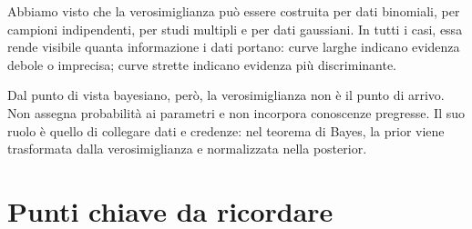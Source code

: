\documentclass[
  italian,
  letterpaper,
  a4paper,
  11pt,
  open=any]{scrbook}
\theoremstyle{plain}
\theoremstyle{definition}
\theoremstyle{definition}
\theoremstyle{remark}
\begin{document}
Abbiamo visto che la verosimiglianza può essere costruita per dati
binomiali, per campioni indipendenti, per studi multipli e per dati
gaussiani. In tutti i casi, essa rende visibile quanta informazione i
dati portano: curve larghe indicano evidenza debole o imprecisa; curve
strette indicano evidenza più discriminante.

Dal punto di vista bayesiano, però, la verosimiglianza non è il punto di
arrivo. Non assegna probabilità ai parametri e non incorpora conoscenze
pregresse. Il suo ruolo è quello di collegare dati e credenze: nel
teorema di Bayes, la prior viene trasformata dalla verosimiglianza e
normalizzata nella posterior.

\section*{Punti chiave da ricordare}\label{punti-chiave-da-ricordare-13}

\end{document}

